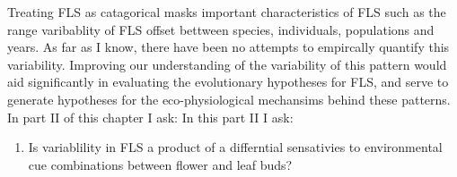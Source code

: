 \documentclass{article}\usepackage[]{graphicx}\usepackage[]{color}
\begin{document}
\indent Treating FLS as catagorical masks important characteristics of FLS such as the range varibablity of FLS offset bettween species, individuals, populations and years. As far as I know, there have been no attempts to empircally quantify this variability. Improving our understanding of the variability of this pattern would aid significantly in evaluating the evolutionary hypotheses for FLS, and serve to generate hypotheses for the eco-physiological mechansims behind these patterns. In part II of this chapter I ask:
 In this part II I ask:
\begin{enumerate}
\item Is variablility in FLS a product of a differntial sensativies to environmental cue combinations between flower and leaf buds?
\end{enumerate}
\end{document}
